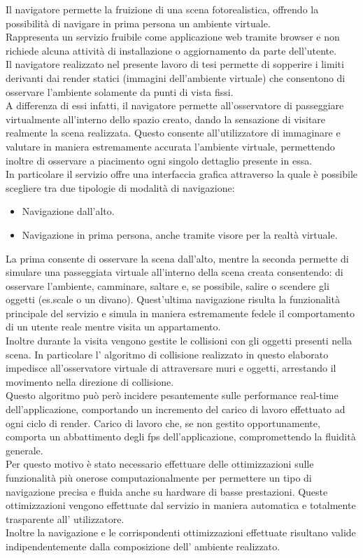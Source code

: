 Il navigatore permette la fruizione di una scena fotorealistica, offrendo la possibilità di navigare in prima persona un ambiente virtuale.
\\
Rappresenta un servizio fruibile come applicazione web tramite browser e non richiede alcuna attività di installazione o aggiornamento da parte dell’utente.
\\
Il navigatore realizzato nel presente lavoro di tesi permette di sopperire i limiti derivanti dai render statici (immagini dell’ambiente virtuale) che consentono di osservare l’ambiente solamente da punti di vista fissi.
\\
A differenza di essi infatti, il navigatore permette all’osservatore di passeggiare virtualmente all’interno dello spazio creato, dando la sensazione di visitare realmente la scena realizzata. 
Questo consente all’utilizzatore di immaginare e valutare in maniera estremamente accurata l’ambiente virtuale, permettendo inoltre di osservare a piacimento ogni singolo dettaglio presente in essa.
\\
In particolare il servizio offre una interfaccia grafica attraverso la quale è possibile scegliere tra due tipologie di modalità di navigazione:
\begin{itemize}
\item Navigazione dall’alto.
\item Navigazione in prima persona, anche tramite visore per la realtà virtuale.
\end{itemize}
La prima consente di osservare la scena dall’alto, mentre la seconda permette di simulare una passeggiata virtuale all’interno della scena creata consentendo: di osservare l’ambiente, camminare, saltare e, se possibile, salire o scendere gli oggetti (es.scale o un divano). Quest’ultima navigazione risulta la funzionalità principale del servizio e simula in maniera estremamente fedele il comportamento di un utente reale mentre visita un appartamento.
\\
Inoltre durante la visita vengono gestite le collisioni con gli oggetti presenti nella scena.
In particolare l’ algoritmo di collisione realizzato in questo elaborato impedisce all’osservatore virtuale di attraversare muri e oggetti, arrestando il movimento nella direzione di collisione. 
\\
Questo algoritmo può però incidere pesantemente sulle performance real-time dell’applicazione, comportando un incremento del carico di lavoro effettuato ad ogni ciclo di render.
Carico di lavoro che, se non gestito opportunamente, comporta un abbattimento degli fps dell’applicazione, compromettendo la fluidità generale.
\\
Per questo motivo è stato necessario effettuare delle ottimizzazioni sulle funzionalità più onerose computazionalmente per permettere un tipo di navigazione precisa e fluida anche su hardware di basse prestazioni. Queste ottimizzazioni vengono effettuate dal servizio in maniera automatica e totalmente trasparente all’ utilizzatore.
\\ 
Inoltre la navigazione e le corrispondenti ottimizzazioni effettuate risultano valide indipendentemente dalla composizione dell’ ambiente realizzato.
\\


